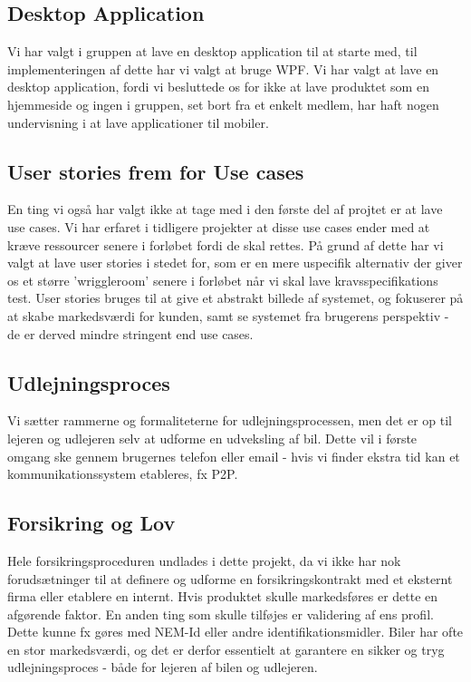 \documentclass[a4paper,12pt,fleqn,oneside]{article}
\begin{document}
\subsection{Desktop Application}
Vi har valgt i gruppen at lave en desktop application til at starte med, til implementeringen af dette har vi valgt at bruge WPF. Vi har valgt at lave en desktop application, fordi vi besluttede os for ikke at lave produktet som en hjemmeside og ingen i gruppen, set bort fra et enkelt medlem, har haft nogen undervisning i at lave applicationer til mobiler. 

\subsection{User stories frem for Use cases}
En ting vi også har valgt ikke at tage med i den første del af projtet er at lave use cases. Vi har erfaret i tidligere projekter at disse use cases ender med at kræve ressourcer senere i forløbet fordi de skal rettes. På grund af dette har vi valgt at lave user stories i stedet for,  som er en mere uspecifik alternativ der giver os et større 'wriggleroom' senere i forløbet når vi skal lave kravsspecifikations test. User stories bruges til at give et abstrakt billede af systemet, og fokuserer på at skabe markedsværdi for kunden, samt se systemet fra brugerens perspektiv - de er derved mindre stringent end use cases. 

\subsection{Udlejningsproces}
Vi sætter rammerne og formaliteterne for udlejningsprocessen, men det er op til lejeren og udlejeren selv at udforme en udveksling af bil. Dette vil i første omgang ske gennem brugernes telefon eller email - hvis vi finder ekstra tid kan et kommunikationssystem etableres, fx P2P.

\subsection{Forsikring og Lov}
Hele forsikringsproceduren undlades i dette projekt, da vi ikke har nok forudsætninger til at definere og udforme en forsikringskontrakt med et eksternt firma eller etablere en internt. Hvis produktet skulle markedsføres er dette en afgørende faktor. 
En anden ting som skulle tilføjes er validering af ens profil. Dette kunne fx gøres med NEM-Id eller andre identifikationsmidler. Biler har ofte en stor markedsværdi, og det er derfor essentielt at garantere en sikker og tryg udlejningsproces - både for lejeren af bilen og udlejeren.
\end{document}
